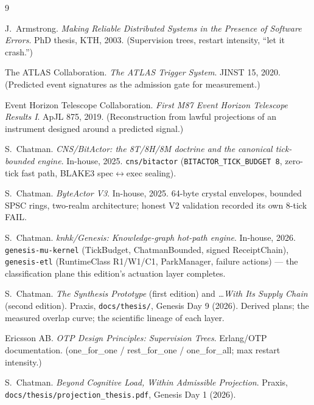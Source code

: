 \documentclass[11pt,a4paper]{article}
\theoremstyle{definition}
\theoremstyle{remark}
\begin{document}
\begin{thebibliography}{9}

 J.~Armstrong. \emph{Making Reliable Distributed
Systems in the Presence of Software Errors}. PhD thesis, KTH, 2003.
(Supervision trees, restart intensity, ``let it crash.'')

 The ATLAS Collaboration. \emph{The ATLAS Trigger System}.
JINST 15, 2020. (Predicted event signatures as the admission gate for
measurement.)

 Event Horizon Telescope Collaboration. \emph{First M87
Event Horizon Telescope Results I}. ApJL 875, 2019. (Reconstruction from
lawful projections of an instrument designed around a predicted signal.)

 S.~Chatman. \emph{CNS/BitActor: the 8T/8H/8M doctrine
and the canonical tick-bounded engine}. In-house, 2025.
\texttt{cns/bitactor} (\texttt{BITACTOR\_TICK\_BUDGET 8}, zero-tick fast
path, BLAKE3 spec$\leftrightarrow$exec sealing).

 S.~Chatman. \emph{ByteActor V3}. In-house, 2025.
64-byte crystal envelopes, bounded SPSC rings, two-realm architecture;
honest V2 validation recorded its own 8-tick FAIL.

 S.~Chatman. \emph{knhk/Genesis: Knowledge-graph hot-path
engine}. In-house, 2026. \texttt{genesis-mu-kernel} (TickBudget,
ChatmanBounded, signed ReceiptChain), \texttt{genesis-etl}
(RuntimeClass R1/W1/C1, ParkManager, failure actions) --- the
classification plane this edition's actuation layer completes.

 S.~Chatman. \emph{The Synthesis Prototype} (first edition)
and \emph{…With Its Supply Chain} (second edition). Praxis,
\texttt{docs/thesis/}, Genesis Day 9 (2026). Derived plans; the
measured overlap curve; the scientific lineage of each layer.

 Ericsson AB. \emph{OTP Design Principles:
Supervision Trees}. Erlang/OTP documentation. (one\_for\_one /
rest\_for\_one / one\_for\_all; max restart intensity.)

 S.~Chatman. \emph{Beyond Cognitive Load, Within
Admissible Projection}. Praxis, \texttt{docs/thesis/projection\_thesis.pdf},
Genesis Day 1 (2026).

\end{thebibliography}
\end{document}
